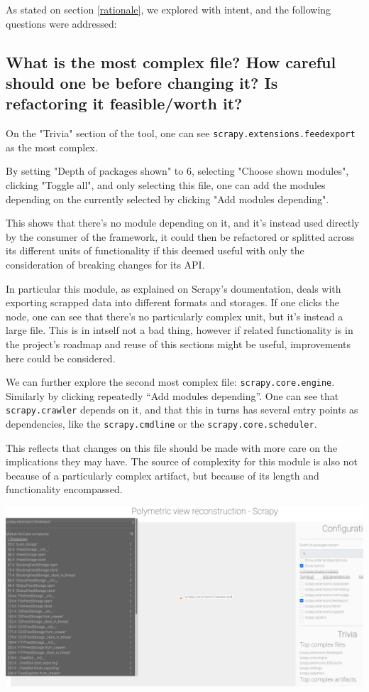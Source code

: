 \documentclass[a4paper,11pt]{article}
\begin{document}
As stated on section \ref{rationale}, we explored with intent, and the following questions were addressed:

\subsection{What is the most complex file? How careful should one be before changing it? Is refactoring it feasible/worth it?}
\label{sec:orgc9d7d6f}
On the "Trivia" section of the tool, one can see \texttt{scrapy.extensions.feedexport} as the most complex.

By setting "Depth of packages shown" to 6, selecting "Choose shown modules", clicking "Toggle all", and only selecting this file, one can add the modules depending on the currently selected by clicking "Add modules depending".

This shows that there's no module depending on it, and it's instead used directly by the consumer of the framework, it could then be refactored or splitted across its different units of functionality if this deemed useful with only the consideration of breaking changes for its API.

In particular this module, as explained on Scrapy's doumentation, deals with exporting scrapped data into different formats and storages. If one clicks the node, one can see that there's no particularly complex unit, but it's instead a large file. This is in intself not a bad thing, however if related functionality is in the project's roadmap and reuse of this sections might be useful, improvements here could be considered.

We can further explore the second most complex file: \texttt{scrapy.core.engine}. Similarly by clicking repeatedly ``Add modules depending''. One can see that \texttt{scrapy.crawler} depends on it, and that this in turns has several entry points as dependencies, like the \texttt{scrapy.cmdline} or the \texttt{scrapy.core.scheduler}.

This reflects that changes on this file should be made with more care on the implications they may have. The source of complexity for this module is also not because of a particularly complex artifact, but because of its length and functionality encompassed.

\begin{center}
\includegraphics[width=.9\linewidth]{../screenshots/feedexport.png}
\end{center}
\end{document}
